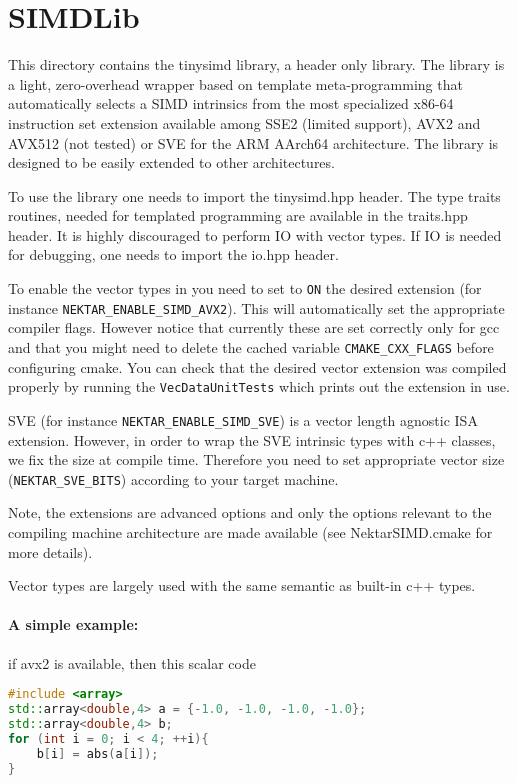 %
\section{SIMDLib}

This directory contains the tinysimd library, a header only library.
The library is a light, zero-overhead wrapper based on template meta-programming that automatically selects a SIMD intrinsics from the most specialized x86-64 instruction set extension available among SSE2 (limited support), AVX2 and AVX512 (not tested) or SVE for the ARM AArch64 architecture.
The library is designed to be easily extended to other architectures.

To use the library one needs to import the tinysimd.hpp header.
The type traits routines, needed for templated programming are available in the traits.hpp header.
It is highly discouraged to perform IO with vector types. If IO is needed for debugging, one needs to import the io.hpp header.

To enable the vector types in {\nek} you need to set to \verb+ON+ the desired extension (for instance \verb+NEKTAR_ENABLE_SIMD_AVX2+).
This will automatically set the appropriate compiler flags. However notice that currently these are set correctly only for gcc and that you might need to delete the cached variable \verb+CMAKE_CXX_FLAGS+ before configuring cmake.
You can check that the desired vector extension was compiled properly by running the \verb+VecDataUnitTests+ which prints out the extension in use.

SVE (for instance \verb+NEKTAR_ENABLE_SIMD_SVE+) is a vector length agnostic ISA extension.
However, in order to wrap the SVE intrinsic types with c++ classes, we fix the size at compile time.
Therefore you need to set appropriate vector size (\verb+NEKTAR_SVE_BITS+) according to your target machine.

Note, the extensions are advanced options and only the options relevant to the compiling machine architecture are made available (see NektarSIMD.cmake for more details).

Vector types are largely used with the same semantic as built-in c++ types.

\paragraph{A simple example: } if avx2 is available, then this scalar code
\begin{lstlisting}[language=C++]
#include <array>
std::array<double,4> a = {-1.0, -1.0, -1.0, -1.0};
std::array<double,4> b;
for (int i = 0; i < 4; ++i){
    b[i] = abs(a[i]);
}
\end{lstlisting}

